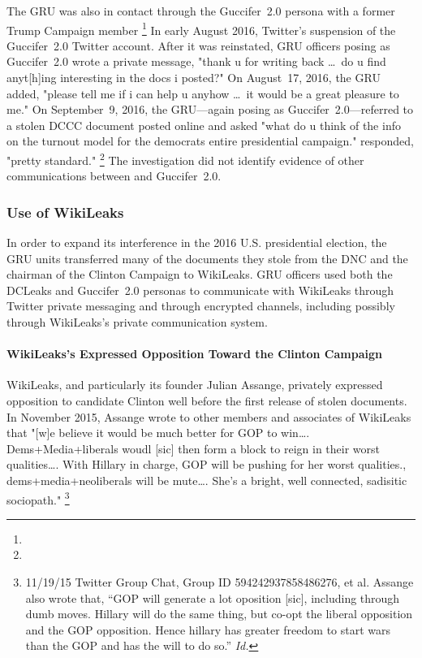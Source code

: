 The GRU was also in contact through the Guccifer~2.0 persona with  a former Trump Campaign member %
\footnote{}
In early August 2016,  Twitter's suspension of the Guccifer~2.0 Twitter account.
After it was reinstated, GRU officers posing as Guccifer~2.0 wrote  a private message, "thank u for writing back \dots\ do u find anyt[h]ing interesting in the docs i posted?"
On August~17, 2016, the GRU added, "please tell me if i can help u anyhow \dots\ it would be a great pleasure to me."
On September~9, 2016, the GRU---again posing as Guccifer~2.0---referred to a stolen DCCC document posted online and asked  "what do u think of the info on the turnout model for the democrats entire presidential campaign."
 responded, "pretty standard."%
\footnote{}
The investigation did not identify evidence of other communications between  and Guccifer~2.0.

\subsubsection{Use of WikiLeaks}

In order to expand its interference in the 2016 U.S. presidential election, the GRU units transferred many of the documents they stole from the DNC and the chairman of the Clinton Campaign to WikiLeaks.
GRU officers used both the DCLeaks and Guccifer~2.0 personas to communicate with WikiLeaks through Twitter private messaging and through encrypted channels, including possibly through WikiLeaks's private communication system.

\paragraph{WikiLeaks's Expressed Opposition Toward the Clinton Campaign}

WikiLeaks, and particularly its founder Julian Assange, privately expressed opposition to candidate Clinton well before the first release of stolen documents.
In November 2015, Assange wrote to other members and associates of WikiLeaks that "[w]e believe it would be much better for GOP to win\dots.
Dems+Media+liberals woudl [sic] then form a block to reign in their worst qualities\dots.
With Hillary in charge, GOP will be pushing for her worst qualities., dems+media+neoliberals will be mute\dots.
She's a bright, well connected, sadisitic sociopath."%
\footnote{11/19/15 Twitter Group Chat, Group ID 594242937858486276, \@WikiLeaks et al.
Assange also wrote that, ``GOP will generate a lot oposition [sic], including through dumb moves.
Hillary will do the same thing, but co-opt the liberal opposition and the GOP opposition.
Hence hillary has greater freedom to start wars than the GOP and has the will to do so.'' \textit{Id.}}

